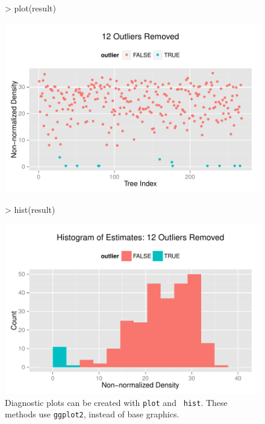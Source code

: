 \documentclass{article}
\begin{document}
\begin{figure}
  \centering
\begin{Schunk}
\begin{Sinput}
> plot(result)
\end{Sinput}
\end{Schunk}
\includegraphics{kdetrees-006}
\begin{Schunk}
\begin{Sinput}
> hist(result)
\end{Sinput}
\end{Schunk}
\includegraphics{kdetrees-007}
  \caption{Diagnostic plots can be created with {\tt plot} and {\tt
      hist}. These methods use {\tt ggplot2}, instead of base graphics.}
  \label{fig:diagplots}
\end{figure}
\end{document}
